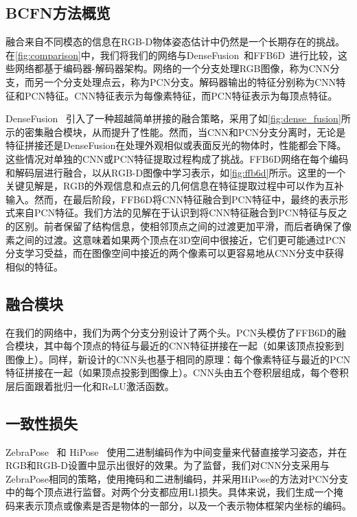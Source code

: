 \subsection{BCFN方法概览}

融合来自不同模态的信息在RGB-D物体姿态估计中仍然是一个长期存在的挑战。在\autoref{fig:comparison}中，我们将我们的网络与DenseFusion~\cite{wang2019densefusion}和FFB6D~\cite{he2021ffb6d}进行比较，这些网络都基于编码器-解码器架构。网络的一个分支处理RGB图像，称为CNN分支，而另一个分支处理点云，称为PCN分支。解码器输出的特征分别称为CNN特征和PCN特征。CNN特征表示为每像素特征，而PCN特征表示为每顶点特征。

DenseFusion~\cite{wang2019densefusion} 引入了一种超越简单拼接的融合策略，采用了如\autoref{fig:dense_fusion}所示的密集融合模块，从而提升了性能。然而，当CNN和PCN分支分离时，无论是特征拼接还是DenseFusion在处理外观相似或表面反光的物体时，性能都会下降。这些情况对单独的CNN或PCN特征提取过程构成了挑战。FFB6D网络在每个编码和解码层进行融合，以从RGB-D图像中学习表示，如\autoref{fig:ffb6d}所示。这里的一个关键见解是，RGB的外观信息和点云的几何信息在特征提取过程中可以作为互补输入。然而，在最后阶段，FFB6D将CNN特征融合到PCN特征中，最终的表示形式来自PCN特征。我们方法的见解在于认识到将CNN特征融合到PCN特征与反之的区别。前者保留了结构信息，使相邻顶点之间的过渡更加平滑，而后者确保了像素之间的过渡。这意味着如果两个顶点在3D空间中很接近，它们更可能通过PCN分支学习受益，而在图像空间中接近的两个像素可以更容易地从CNN分支中获得相似的特征。

\subsection{融合模块}
在我们的网络中，我们为两个分支分别设计了两个头。PCN头模仿了FFB6D的融合模块，其中每个顶点的特征与最近的CNN特征拼接在一起（如果该顶点投影到图像上）。同样，新设计的CNN头也基于相同的原理：每个像素特征与最近的PCN特征拼接在一起（如果顶点投影到图像上）。CNN头由五个卷积层组成，每个卷积层后面跟着批归一化和ReLU激活函数。

\subsection{一致性损失}

ZebraPose~\cite{su2022zebrapose} 和 HiPose~\cite{2024hipose} 使用二进制编码作为中间变量来代替直接学习姿态，并在RGB和RGB-D设置中显示出很好的效果。为了监督，我们对CNN分支采用与ZebraPose相同的策略，使用掩码和二进制编码，并采用HiPose的方法对PCN分支中的每个顶点进行监督。对两个分支都应用L1损失。具体来说，我们生成一个掩码来表示顶点或像素是否是物体的一部分，以及一个表示物体框架内坐标的编码。

